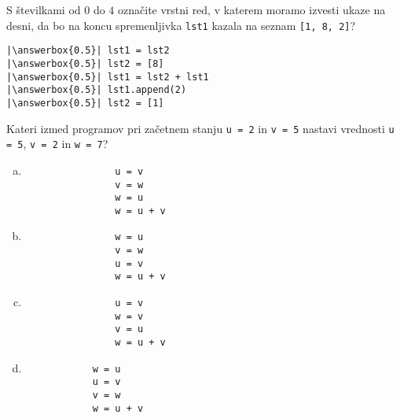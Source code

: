 \documentclass[arhiv, 10pt]{../izpit}
\newcommand{\inlinepy}[1]{\texttt{#1}}
\newcommand{\answerbox}[1]{\framebox{\vphantom{\large M}\hspace{#1cm}}}
\begin{document}
        \naloga*
        \begin{multicols}{2}
        \noindent 
        S številkami od $0$ do $4$ označite vrstni red, v katerem moramo izvesti ukaze na desni, da bo na koncu spremenljivka \inlinepy{lst1} kazala na seznam \inlinepy{[1, 8, 2]}?
    
        \columnbreak
        \noindent
        \begin{verbatim}
|\answerbox{0.5}| lst1 = lst2
|\answerbox{0.5}| lst2 = [8]
|\answerbox{0.5}| lst1 = lst2 + lst1
|\answerbox{0.5}| lst1.append(2)
|\answerbox{0.5}| lst2 = [1]

        \end{verbatim}
        \end{multicols}
    
            
        \naloga*
        
        Kateri izmed programov pri začetnem stanju
            \inlinepy{u = 2} in
            \inlinepy{v = 5}
        nastavi vrednosti
            \inlinepy{u = 5},
            \inlinepy{v = 2} in
            \inlinepy{w = 7}?
    
        \begin{multicols}{4}
        \begin{enumerate}[(a)]
\item 
                \begin{verbatim}
                u = v
                v = w
                w = u
                w = u + v
                \end{verbatim}
            
\item 
                \begin{verbatim}
                w = u
                v = w
                u = v
                w = u + v
                \end{verbatim}
            
\item 
                \begin{verbatim}
                u = v
                w = v
                v = u
                w = u + v
                \end{verbatim}
            
\item 
            \begin{verbatim}
            w = u
            u = v
            v = w
            w = u + v
            \end{verbatim}
        
\end{enumerate}

        \end{multicols}
    
\end{document}
